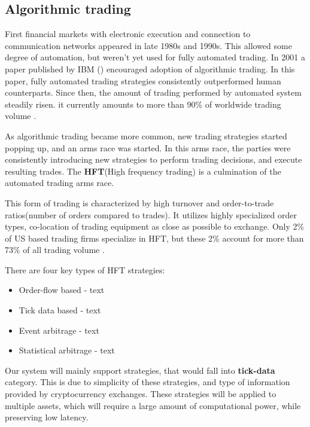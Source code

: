 \subsection{Algorithmic trading}
First financial markets with electronic execution and connection to communication networks appeared
in late 1980s and 1990s. This allowed some degree of automation, but weren't yet used for fully
automated trading. In 2001 a paper published by IBM ()
encouraged adoption of algorithmic trading. In this paper, fully automated trading strategies
consistently outperformed human counterparts. Since then, the amount of trading performed by
automated system steadily risen. it currently amounts to more than 90\% of worldwide
trading volume .

As algorithmic trading became more common, new trading strategies started popping up, and
an arms race was started. In this arms race, the parties were consistently introducing new
strategies to perform trading decisions, and execute resulting trades. The \textbf{HFT}(High frequency trading)
is a culmination of the automated trading arms race.

This form of trading is characterized by high turnover and order-to-trade ratios(number of orders compared to trades).
It utilizes highly specialized order types, co-location of trading equipment as close as possible to exchange.
Only 2\% of US based trading firms specialize in HFT, but these 2\% account for more than 73\% of all
trading volume .

There are four key types of HFT strategies:
\begin{itemize}
    \item {Order-flow based - text }
    \item {Tick data based - text }
    \item {Event arbitrage - text}
    \item {Statistical arbitrage - text }
\end{itemize}



Our system will mainly support strategies, that would fall into \textbf{tick-data} category. This is due
to simplicity of these strategies, and type of information provided by cryptocurrency exchanges. These strategies will be
applied to multiple assets, which will require a large amount of computational power, while preserving low latency.

